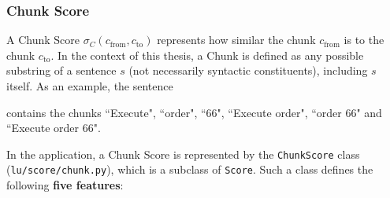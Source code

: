 \subsubsection{Chunk Score} \label{ch:arch:LU:scores:chunk}
A Chunk Score $\sigma_C(c_\text{from},c_\text{to})$ represents how similar the chunk $c_\text{from}$ is to the chunk $c_\text{to}$. In the context of this thesis, a Chunk is defined as any possible substring of a sentence $s$ (not necessarily syntactic constituents), including $s$ itself. As an example, the sentence 

 contains the chunks ``Execute", ``order", ``66", ``Execute order", ``order 66" and ``Execute order 66".

In the application, a Chunk Score is represented by the \texttt{ChunkScore} class (\texttt{lu/score/chunk.py}), which is a subclass of \texttt{Score}. Such a class defines the following \textbf{five features}:
